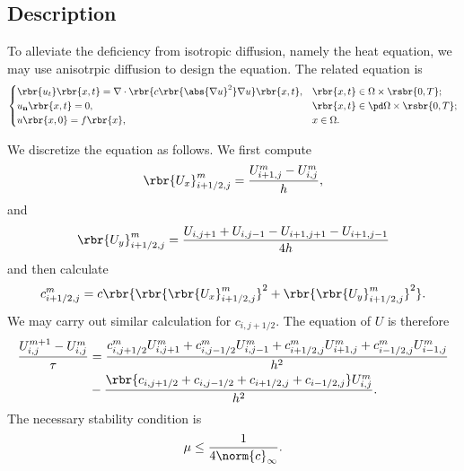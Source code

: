\documentclass[english, nochinese]{pnote}
\begin{document}
\subsection{Description}

To alleviate the deficiency from isotropic diffusion, namely the heat equation, we may use anisotrpic diffusion to design the equation. The related equation is
\begin{equation}
\begin{cases}
\rbr{u_t} \rbr{ x, t } = \nabla \cdot \rbr{ c \rbr{\abs{ \nabla u }^2} \nabla u } \rbr{ x, t }, & \rbr{ x, t } \in \Omega \times \rsbr{ 0, T }; \\
u_{\mathbf{n}} \rbr{ x, t } = 0, & \rbr{ x, t } \in \pd \Omega \times \rsbr{ 0, T }; \\
u \rbr{ x, 0 } = f \rbr{x}, & x \in \Omega.
\end{cases}
\end{equation}

We discretize the equation as follows. We first compute
\begin{equation}
\rbr{U_x}_{ i + 1 / 2, j }^m = \frac{ U_{ i + 1 , j }^m - U_{ i, j }^m }{h},
\end{equation}
and
\begin{equation}
\rbr{U_y}_{ i + 1 / 2, j }^m = \frac{ U_{ i, j + 1 } + U_{ i, j - 1 } - U_{ i + 1, j + 1 } - U_{ i + 1, j - 1 } }{ 4 h }
\end{equation}
and then calculate
\begin{equation}
c_{ i + 1 / 2, j }^m = c \rbr{ \rbr{\rbr{U_x}_{ i + 1 / 2, j }^m}^2 + \rbr{\rbr{U_y}_{ i + 1 / 2, j }^m}^2 }.
\end{equation}
We may carry out similar calculation for $c_{ i, j + 1 / 2 } $. The equation of $U$ is therefore
\begin{equation}
\begin{split}
\frac{ U_{ i, j }^{ m + 1 } - U_{ i, j }^m }{\tau} &= \frac{ c_{ i, j + 1 / 2 }^m U_{ i, j + 1 }^m + c_{ i, j - 1 / 2 }^m U_{ i, j - 1 }^m + c_{ i + 1 / 2, j }^m U_{ i + 1, j }^m + c_{ i - 1 / 2, j }^m U_{ i - 1, j }^m }{h^2} \\
&- \frac{ \rbr{ c_{ i, j + 1 / 2 } + c_{ i, j - 1 / 2 } + c_{ i + 1 / 2, j } + c_{ i - 1 / 2, j } } U_{ i, j }^m }{h^2}.
\end{split}
\end{equation}
The necessary stability condition is
\begin{equation}
\mu \le \frac{1}{ 4 \norm{c}_{\infty} }.
\end{equation}
\end{document}
